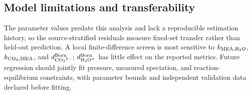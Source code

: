 \subsection{Model limitations and transferability}
The parameter values predate this analysis and lack a reproducible estimation history, so the source-stratified residuals measure fixed-set transfer rather than held-out prediction.  A local finite-difference screen is most sensitive to \(k_{\MEA,\HtwoO}\), \(k_{\COtwo,\MEA}\), and \(d_{\COthree}^{\mathrm{Born}}\); \(d_{\HthreeO}^{\mathrm{Born}}\) has little effect on the reported metrics.  Future regression should jointly fit pressure, measured speciation, and reaction-equilibrium constraints, with parameter bounds and independent validation data declared before fitting.
